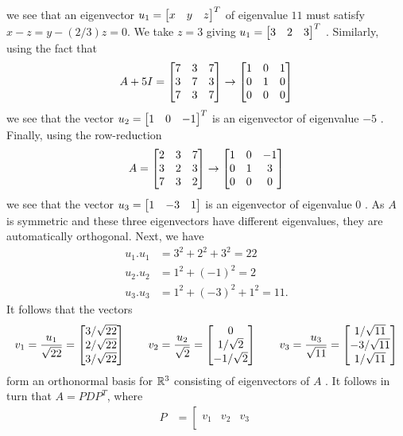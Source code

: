 \documentclass[a4paper]{article}
\begin{document}
\begin{solution}
\begin{itemize}
\[   \]
   we see that an eigenvector $u_1=\left[\begin{matrix} x&y&z\end{matrix}\right]^T$ of eigenvalue
   $11$ must satisfy $x-z=y-(2/3)z=0$.  We take $z=3$ giving
   $u_1=\left[\begin{matrix} 3&2&3\end{matrix}\right]^T$ .  Similarly, using the fact that 
   \[ A+5I = 
       \left[\begin{matrix}
       7&3&7\\
       3&7&3\\
       7&3&7\\
       \end{matrix}\right] \to
       \left[\begin{matrix}
       1&0&1\\
       0&1&0\\
       0&0&0\\
       \end{matrix}\right]
   \]
   we see that the vector $u_2=\left[\begin{matrix} 1&0&-1\end{matrix}\right]^T$ is an eigenvector of
   eigenvalue $-5$ .  Finally, using the row-reduction 
   \[ A = 
       \left[\begin{matrix}
       2&3&7\\
       3&2&3\\
       7&3&2\\
       \end{matrix}\right] \to 
       \left[\begin{matrix}
       1&0&-1\\
       0&1&3\\
       0&0&0\\
       \end{matrix}\right]
   \]
   we see that the vector $u_3=\left[\begin{matrix} 1&-3&1\end{matrix}\right]$ is an eigenvector of
   eigenvalue $0$ .  As $A$ is symmetric and these three eigenvectors
   have different eigenvalues, they are automatically orthogonal.
   Next, we have 
   \begin{align*}
    u_1.u_1 &= 3^2+2^2+3^2 = 22 \\
    u_2.u_2 &= 1^2+(-1)^2 = 2 \\
    u_3.u_3 &= 1^2+(-3)^2+1^2 = 11.
   \end{align*}
   It follows that the vectors 
   \[ v_1 = \frac{u_1}{\sqrt{22}} =
             \left[\begin{matrix} 3/\sqrt{22}\\ 2/\sqrt{22} \\ 3/\sqrt{22}\end{matrix}\right] 
      \qquad
      v_2 = \frac{u_2}{\sqrt{2}} = 
             \left[\begin{matrix} 0 \\ 1/\sqrt{2} \\ -1/\sqrt{2} \end{matrix}\right] \\
      \qquad
      v_3 = \frac{u_3}{\sqrt{11}} = 
             \left[\begin{matrix} 1/\sqrt{11} \\ -3/\sqrt{11} \\ 1/\sqrt{11}\end{matrix}\right]
   \] 
   form an orthonormal basis for ${\mathbb{R}}^3$ consisting of eigenvectors of
   $A$ .  It follows in turn that $A=PDP^T$, where 
   \begin{align*}
    P &= \left[\begin{array}{c|c|c}
          && \\ v_1 & v_2 & v_3 \\ && 

\end{array}
\end{align*}
\end{itemize}
\end{solution}
\end{document}
